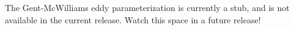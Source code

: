 The Gent-McWilliams eddy parameterization is currently a stub, and is not available in the current release.  Watch this space in a future release!

